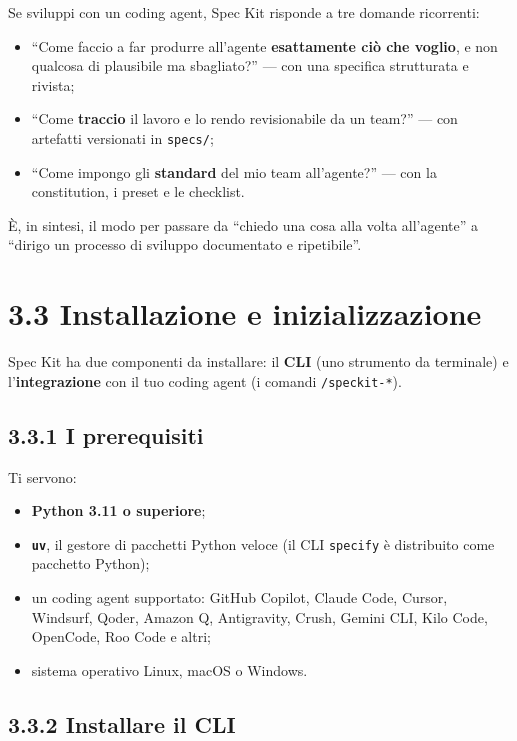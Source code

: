 \documentclass[
  italian,
  10pt,
]{book}
\providecommand{\tightlist}{%
  \setlength{\itemsep}{0pt}\setlength{\parskip}{0pt}}
\begin{document}
Se sviluppi con un coding agent, Spec Kit risponde a tre domande
ricorrenti:

\begin{itemize}
\tightlist
\item
  ``Come faccio a far produrre all'agente \textbf{esattamente ciò che
  voglio}, e non qualcosa di plausibile ma sbagliato?'' --- con una
  specifica strutturata e rivista;
\item
  ``Come \textbf{traccio} il lavoro e lo rendo revisionabile da un
  team?'' --- con artefatti versionati in \texttt{specs/};
\item
  ``Come impongo gli \textbf{standard} del mio team all'agente?'' ---
  con la constitution, i preset e le checklist.
\end{itemize}

È, in sintesi, il modo per passare da ``chiedo una cosa alla volta
all'agente'' a ``dirigo un processo di sviluppo documentato e
ripetibile''.

\section{3.3 Installazione e
inizializzazione}\label{installazione-e-inizializzazione}

Spec Kit ha due componenti da installare: il \textbf{CLI} (uno strumento
da terminale) e l'\textbf{integrazione} con il tuo coding agent (i
comandi \texttt{/speckit-*}).

\subsection{3.3.1 I prerequisiti}\label{i-prerequisiti}

Ti servono:

\begin{itemize}
\tightlist
\item
  \textbf{Python 3.11 o superiore};
\item
  \textbf{\texttt{uv}}, il gestore di pacchetti Python veloce (il CLI
  \texttt{specify} è distribuito come pacchetto Python);
\item
  un coding agent supportato: GitHub Copilot, Claude Code, Cursor,
  Windsurf, Qoder, Amazon Q, Antigravity, Crush, Gemini CLI, Kilo Code,
  OpenCode, Roo Code e altri;
\item
  sistema operativo Linux, macOS o Windows.
\end{itemize}

\subsection{3.3.2 Installare il CLI}\label{installare-il-cli}
\end{document}
